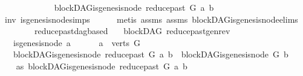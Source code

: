 \begin{isabellebody}
\ \ \ \ \isamarkupfalse%
\isanewline
\ \ \isamarkupfalse%
\isanewline
\ \ \isamarkupfalse%
\ \isamarkupfalse%
\ {\isachardoublequoteopen}blockDAG{\isachardot}{\kern0pt}is{\isacharunderscore}{\kern0pt}genesis{\isacharunderscore}{\kern0pt}node\ {\isacharparenleft}{\kern0pt}reduce{\isacharunderscore}{\kern0pt}past\ G\ a{\isacharparenright}{\kern0pt}\ b{\isachardoublequoteclose}\ \isamarkupfalse%
\ inv\ is{\isacharunderscore}{\kern0pt}genesis{\isacharunderscore}{\kern0pt}node{\isachardot}{\kern0pt}simps\isanewline
\ \ \ \ \isamarkupfalse%
\ {\isacharparenleft}{\kern0pt}metis\ assms{\isacharparenleft}{\kern0pt}{}{\isacharparenright}{\kern0pt}\ assms{\isacharparenleft}{\kern0pt}{}{\isacharparenright}{\kern0pt}\ blockDAG{\isachardot}{\kern0pt}is{\isacharunderscore}{\kern0pt}genesis{\isacharunderscore}{\kern0pt}node{\isachardot}{\kern0pt}elims{\isacharparenleft}{\kern0pt}{}{\isacharparenright}{\kern0pt}\isanewline
\ \ \ \ \ \ \ \ reduce{\isacharunderscore}{\kern0pt}past{\isacharunderscore}{\kern0pt}dagbased{\isacharparenright}{\kern0pt}\ \isanewline
{}\isamarkupfalse%
%
\endisatagproof
{\isafoldproof}%
%
\isadelimproof
\isanewline
%
\endisadelimproof
\isanewline
\isanewline
\isanewline
{}\isamarkupfalse%
\ {\isacharparenleft}{\kern0pt}\ blockDAG{\isacharparenright}{\kern0pt}\ reduce{\isacharunderscore}{\kern0pt}past{\isacharunderscore}{\kern0pt}gen{\isacharunderscore}{\kern0pt}rev{\isacharcolon}{\kern0pt}\isanewline
\ \ \ {\isachardoublequoteopen}{\isasymnot}is{\isacharunderscore}{\kern0pt}genesis{\isacharunderscore}{\kern0pt}node\ a{\isachardoublequoteclose}\ \isanewline
\ \ \ \ \ {\isachardoublequoteopen}a\ {\isasymin}\ verts\ G{\isachardoublequoteclose}\isanewline
\ \ \ {\isachardoublequoteopen}blockDAG{\isachardot}{\kern0pt}is{\isacharunderscore}{\kern0pt}genesis{\isacharunderscore}{\kern0pt}node\ {\isacharparenleft}{\kern0pt}reduce{\isacharunderscore}{\kern0pt}past\ G\ a{\isacharparenright}{\kern0pt}\ b\ {\isasymLongrightarrow}\ blockDAG{\isachardot}{\kern0pt}is{\isacharunderscore}{\kern0pt}genesis{\isacharunderscore}{\kern0pt}node\ G\ b{\isachardoublequoteclose}\isanewline
%
\isadelimproof
%
\endisadelimproof
%
\isatagproof
{}\isamarkupfalse%
\ {\isacharminus}{\kern0pt}\isanewline
\ \ \isamarkupfalse%
\ as{}{\isacharcolon}{\kern0pt}\ {\isachardoublequoteopen}blockDAG{\isachardot}{\kern0pt}is{\isacharunderscore}{\kern0pt}genesis{\isacharunderscore}{\kern0pt}node\ {\isacharparenleft}{\kern0pt}reduce{\isacharunderscore}{\kern0pt}past\ G\ a{\isacharparenright}{\kern0pt}\ b{\isachardoublequoteclose}\isanewline

\end{isabellebody}

